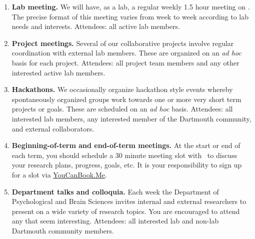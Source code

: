 \documentclass{tufte-book} %
\begin{document}
\begin{enumerate}
\item \textbf{Lab meeting.}  We will have, as a lab, a regular weekly
  1.5 hour meeting on \textbf{\labmeetingtime}.  The precise
  format of this meeting varies from week to week according to lab
  needs and interests. Attendees: all active lab members.

\item \textbf{Project meetings.}  Several of our collaborative
  projects involve regular coordination with external lab members.
  These are organized on an \textit{ad hoc} basis for each project.
  Attendees: all project team members and any other interested active
  lab members.

  \item \textbf{Hackathons.}  We occasionally organize hackathon
    style events whereby spontaneously organized groups work towards
    one or more very short term projects or goals.  These are
    scheduled on an \textit{ad hoc} basis.  Attendees: all interested
    lab members, any interested member of the Dartmouth community, and
    external collaborators.


  \item \textbf{Beginning-of-term and end-of-term meetings.} At the
    start or end of each term, you should schedule a 30 minute
    meeting slot with \director~to discuss your research
    plans, progress, goals, etc.  It is your responsibility to sign up
    for a slot via \href{https://context-lab.youcanbook.me/}{YouCanBook.Me}.

  \item \textbf{Department talks and colloquia.} Each week the
    Department of Psychological and Brain Sciences invites internal
    and external researchers to present on a wide variety of research
    topics.  You are encouraged to attend any that seem interesting.
    Attendees: all interested lab and non-lab Dartmouth community
    members.


\end{enumerate}
\end{document}
